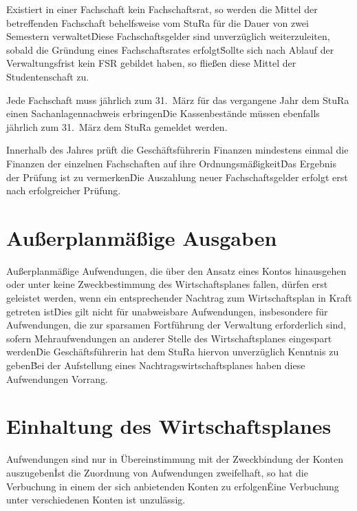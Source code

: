 \begin{multicols}{2}
\Abs \Satz Existiert in einer Fachschaft kein Fachschaftsrat, so werden die Mittel der betreffenden Fachschaft behelfsweise vom StuRa für die Dauer von zwei Semestern verwaltet\. Diese Fachschaftsgelder sind unverzüglich weiterzuleiten, sobald die Gründung eines Fachschaftsrates erfolgt\. Sollte sich nach Ablauf der Verwaltungsfrist kein FSR gebildet haben, so fließen diese Mittel der Studentenschaft zu.

\Abs \Satz Jede Fachschaft muss jährlich zum 31.~März für das vergangene Jahr dem StuRa einen Sachanlagennachweis erbringen\. Die Kassenbestände müssen ebenfalls jährlich zum 31.~März dem StuRa gemeldet werden.

\Abs \Satz Innerhalb des Jahres prüft die Geschäftsführerin Finanzen mindestens einmal die Finanzen der einzelnen Fachschaften auf ihre Ordnungsmäßigkeit\. Das Ergebnis der Prüfung ist zu vermerken\. Die Auszahlung neuer Fachschaftsgelder erfolgt erst nach erfolgreicher Prüfung.



\section{Außerplanmäßige Ausgaben}

\Abs \Satz Außerplanmäßige Aufwendungen, die über den Ansatz eines Kontos hinausgehen oder unter keine Zweckbestimmung des Wirtschaftsplanes fallen, dürfen erst geleistet werden, wenn ein entsprechender Nachtrag zum Wirtschaftsplan in Kraft getreten ist\. Dies gilt nicht für unabweisbare Aufwendungen, insbesondere für Aufwendungen, die zur sparsamen Fortführung der Verwaltung erforderlich sind, sofern Mehraufwendungen an anderer Stelle des Wirtschaftsplanes eingespart werden\. Die Geschäftsführerin hat dem StuRa hiervon unverzüglich Kenntnis zu geben\. Bei der Aufstellung eines Nachtragswirtschaftsplanes haben diese Aufwendungen Vorrang.



\section{Einhaltung des Wirtschaftsplanes}

\Abs \Satz Aufwendungen sind nur in Übereinstimmung mit der Zweckbindung der Konten auszugeben\. Ist die Zuordnung von Aufwendungen zweifelhaft, so hat die Verbuchung in einem der sich anbietenden Konten zu erfolgen\. Eine Verbuchung unter verschiedenen Konten ist unzulässig.




\end{multicols}
